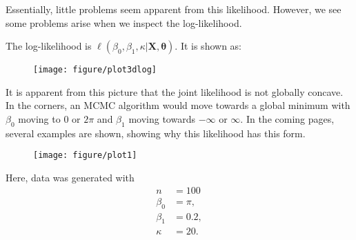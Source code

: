 \documentclass{article}\usepackage[]{graphicx}\usepackage[]{color}
\makeatletter
\def\maxwidth{ %
  \ifdim\Gin@nat@width>\linewidth
    \linewidth
  \else
    \Gin@nat@width
  \fi
}
\newenvironment{knitrout}{}{} %
\makeatother
\begin{document}
Essentially, little problems seem apparent from this likelihood. However, we see some problems arise when we inspect the log-likelihood.

The log-likelihood is $\ell(\beta_0, \beta_1, \kappa \vert \boldsymbol{X}, \boldsymbol{\theta})$. It is shown as:


\begin{figure}[h!]
\begin{knitrout}
\color{fgcolor}

{\centering \texttt{[image: figure/plot3dlog]} 

}



\end{knitrout}

\end{figure}

It is apparent from this picture that the joint likelihood is not globally concave. In the corners, an MCMC algorithm would move towards a global minimum with $\beta_0$ moving to 0 or $2\pi$ and $\beta_1$ moving towards $-\infty$ or $\infty$. In the coming pages, several examples are shown, showing why this likelihood has this form.

\newpage

\begin{figure}[t!]
\begin{knitrout}
\color{fgcolor}

{\centering \texttt{[image: figure/plot1]} 

}



\end{knitrout}

\end{figure}

Here, data was generated with
\begin{align*}
n &= 100 \\
\beta_0 &= \pi, \\
\beta_1 &= 0.2, \\
\kappa &= 20.
\end{align*}
\end{document}
